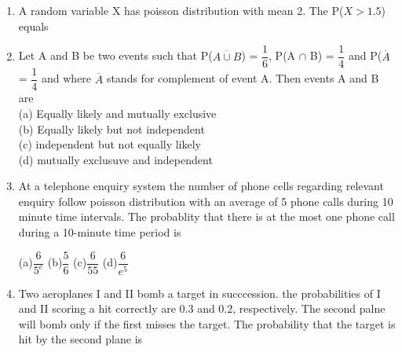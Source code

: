 \documentclass[journal,12pt,twocolumn]{IEEEtran}
\begin{document}
\begin{enumerate}[label=\arabic*]
	\begin{itemize}
	\begin{multicols}{4}
	\item[(a)]$\dfrac{2}{9}$  \item[(b)]$\dfrac{1}{9}$  \item[(c)]$\dfrac{8}{9}$  \item[(d)]$\dfrac{7}{9}$
	\end{multicols}
	\end{itemize}
	\item A random variable X has poisson distribution with mean 2. The P($X>1.5$) equals
	\begin{itemize}
	\begin{multicols}{4}
	\item[(a)]$\dfrac{2}{e^{2}}$ \item[(b)]0 \item[(c)]1-$\dfrac{3}{e^{2}}$ \item[(d)]$\dfrac{3}{e^{2}}$
	\end{multicols}
	\end{itemize}
	\item Let  A and B be two events such that P($\overline{A \cup B}$) = $\dfrac{1}{6}$, P(A $\cap$ B) = $\dfrac{1}{4}$ and P($\overline{A}$ = $\dfrac{1}{4}$ and where $\overline{A}$ stands for complement of event A. Then events A and B are\\
	(a) Equally likely and mutually exclusive\\
	(b) Equally likely but not independent\\
	(c) independent but not equally likely\\
	(d) mutually exclusuve and independent\\
	\item At a telephone enquiry system the number of phone cells regarding relevant enquiry follow poisson distribution with an average of 5 phone calls during 10 minute time intervals. The probablity that there is at the most one phone call during a 10-minute time period is
	\begin{multicols}{4}
	(a)$\dfrac{6}{5^{e}}$ (b)$\dfrac{5}{6}$ (c)$\dfrac{6}{55}$ (d)$\dfrac{6}{e^{5}}$
	\end{multicols}
	\item Two  aeroplanes I and II bomb a target in succcession. the probabilities of I and II scoring a hit correctly are 0.3 and 0.2, respectively. The second palne will bomb only if the first misses the target. The probability that the target is hit by the second plane is\\

\end{enumerate}
\end{document}
